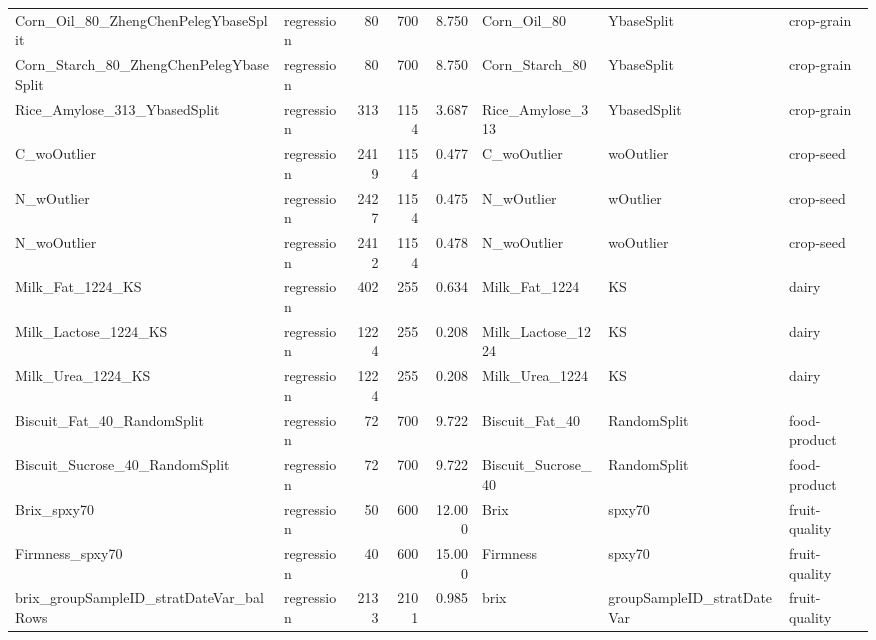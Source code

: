 \begin{landscape}
\begin{longtable}{L{6.2cm}L{2.1cm}rrrL{6.0cm}L{2.6cm}L{3.0cm}}
Corn\_\allowbreak{}Oil\_\allowbreak{}80\_\allowbreak{}ZhengChenPelegYbaseSplit & regression & 80 & 700 & 8.750 & Corn\_\allowbreak{}Oil\_\allowbreak{}80 & YbaseSplit & crop-\allowbreak{}grain \\
Corn\_\allowbreak{}Starch\_\allowbreak{}80\_\allowbreak{}ZhengChenPelegYbaseSplit & regression & 80 & 700 & 8.750 & Corn\_\allowbreak{}Starch\_\allowbreak{}80 & YbaseSplit & crop-\allowbreak{}grain \\
Rice\_\allowbreak{}Amylose\_\allowbreak{}313\_\allowbreak{}YbasedSplit & regression & 313 & 1154 & 3.687 & Rice\_\allowbreak{}Amylose\_\allowbreak{}313 & YbasedSplit & crop-\allowbreak{}grain \\
C\_\allowbreak{}woOutlier & regression & 2419 & 1154 & 0.477 & C\_\allowbreak{}woOutlier & woOutlier & crop-\allowbreak{}seed \\
N\_\allowbreak{}wOutlier & regression & 2427 & 1154 & 0.475 & N\_\allowbreak{}wOutlier & wOutlier & crop-\allowbreak{}seed \\
N\_\allowbreak{}woOutlier & regression & 2412 & 1154 & 0.478 & N\_\allowbreak{}woOutlier & woOutlier & crop-\allowbreak{}seed \\
Milk\_\allowbreak{}Fat\_\allowbreak{}1224\_\allowbreak{}KS & regression & 402 & 255 & 0.634 & Milk\_\allowbreak{}Fat\_\allowbreak{}1224 & KS & dairy \\
Milk\_\allowbreak{}Lactose\_\allowbreak{}1224\_\allowbreak{}KS & regression & 1224 & 255 & 0.208 & Milk\_\allowbreak{}Lactose\_\allowbreak{}1224 & KS & dairy \\
Milk\_\allowbreak{}Urea\_\allowbreak{}1224\_\allowbreak{}KS & regression & 1224 & 255 & 0.208 & Milk\_\allowbreak{}Urea\_\allowbreak{}1224 & KS & dairy \\
Biscuit\_\allowbreak{}Fat\_\allowbreak{}40\_\allowbreak{}RandomSplit & regression & 72 & 700 & 9.722 & Biscuit\_\allowbreak{}Fat\_\allowbreak{}40 & RandomSplit & food-\allowbreak{}product \\
Biscuit\_\allowbreak{}Sucrose\_\allowbreak{}40\_\allowbreak{}RandomSplit & regression & 72 & 700 & 9.722 & Biscuit\_\allowbreak{}Sucrose\_\allowbreak{}40 & RandomSplit & food-\allowbreak{}product \\
Brix\_\allowbreak{}spxy70 & regression & 50 & 600 & 12.000 & Brix & spxy70 & fruit-\allowbreak{}quality \\
Firmness\_\allowbreak{}spxy70 & regression & 40 & 600 & 15.000 & Firmness & spxy70 & fruit-\allowbreak{}quality \\
brix\_\allowbreak{}groupSampleID\_\allowbreak{}stratDateVar\_\allowbreak{}balRows & regression & 2133 & 2101 & 0.985 & brix & groupSampleID\_\allowbreak{}stratDateVar & fruit-\allowbreak{}quality \\

\end{longtable}
\end{landscape}
